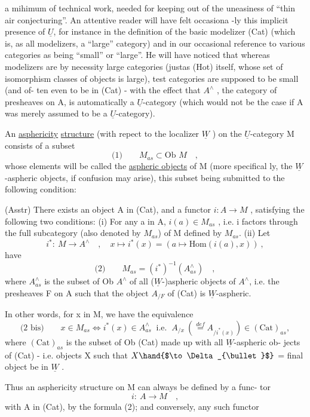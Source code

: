 a mihimum of technical work,  needed for keeping out of the uneasiness
of ``thin air conjecturing''\hand{)}. An attentive reader will have felt occasiona%
-ly this implicit presence of $\underline{U}$,  for instance in the definition of the
basic modelizer (Cat) (which is,  as all modelizers,  a ``large'' category)\hand{,}
and in our occasional reference to various categories as being ``small'' or
``large''.  He will have noticed that whereas modelizers are by necessity
large categories (justas (Hot) itself,  whose set of isomorphism classes
of objects is large),  test categories are supposed to be small (and of-%
ten even to be in (Cat)\hand{)} -  with the effect that $A^{\wedge}$ ,  the category of
presheaves on A, is automatically a $\underline{U}$-category  (which would not be the
case if A was merely assumed to be a $\underline{U}$-category).

An \uline{asphericity} \uline{structure} (with repect to the  localizer $\underline{W}$ )
on the $\underline{U}$-category M consists of a subset
\[ \text{(1)} \qquad M_{as} \subset \text{Ob } M \quad , \]
whose elements will be called the \uline{aspheric objects} of M  (more specifical%
ly,  the $\underline{W}$-aspheric objects,  if confusion may arise),  this subset being
submitted to the following condition:

(Asstr)  There exists an object A in (Cat),  and a functor $i: A \longrightarrow M$ ,
satisfying the following two conditions:
(i)  For any a in A,  $i(a) \in M_{as}$ ,  i.e.  i factors through the
full subcategory (also denoted by $M_{as}$) of M defined by $M_{as}$.
(ii)  Let
\[ i^{*}:\ M \longrightarrow A^{\wedge} \quad , \quad x \mapsto i^{*}(x) = (a \mapsto \text{Hom}(i(a),x)) \ , \]
   have
\[ \text{(2)} \qquad M_{as} = (i^{*})^{-1}(A^{\wedge}_{as}) \quad , \]
where $A^{\wedge}_{as}$ is the subset of Ob $A^{\wedge}$ of all ($\underline{W}$-)aspheric objects
of $A^{\wedge}$,  i.e. the  presheaves F on A such that the
object $A_{/F}$  of (Cat) is $\underline{W}$-aspheric.

In other words, for x in M,  we have the equivalence
\[ \text{(2 bis)} \qquad x \in M_{as} \Longleftrightarrow i^{*}(x) \in A^{\wedge}_{as} \ \text{ i.e. } \ A_{/x}\ (\overset{def}{=} A_{/i^{*}(x)}) \in (\text{Cat})_{as} , \]
where $(\text{Cat})_{as}$ is the subset of Ob (Cat) made up with all $\underline{W}$-aspheric ob-%
jects of (Cat)  -  i.e. objects X such that  $X \hand{$\to \Delta_{\bullet}$}$ \hand{(}= final object\hand{)}
be in $\underline{W}$ .

Thus an asphericity structure on M can always be defined by a func-%
tor  
\[ i:\ A \longrightarrow M \quad , \]
with A in (Cat),  by the formula  (2);  and conversely,  any such functor

